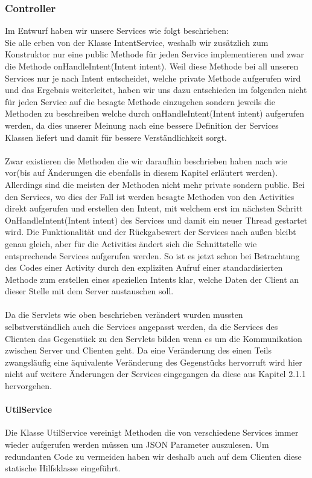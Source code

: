 \documentclass{scrartcl}
\begin{document}
	\subsubsection{Controller}
	Im Entwurf haben wir unsere Services wie folgt beschrieben: 
\\
Sie alle erben von der Klasse IntentService, weshalb wir zusätzlich zum Konstruktor nur eine public Methode für jeden Service implementieren und zwar die Methode onHandleIntent(Intent intent). Weil diese Methode bei all unseren Services nur je nach Intent entscheidet, welche private Methode aufgerufen wird und das Ergebnis weiterleitet, haben wir uns dazu entschieden im folgenden nicht für jeden Service auf die besagte Methode einzugehen sondern jeweils die Methoden zu beschreiben welche durch onHandleIntent(Intent intent) aufgerufen werden, da dies unserer Meinung nach eine bessere Definition der Services Klassen liefert und damit für bessere Verständlichkeit sorgt.
\\
\\
Zwar existieren die Methoden die wir daraufhin beschrieben haben nach wie vor(bis auf Änderungen die ebenfalls in diesem Kapitel erläutert werden).
Allerdings sind die meisten der Methoden nicht mehr private sondern public. Bei den Services, wo dies der Fall ist werden besagte Methoden von den Activities direkt aufgerufen und erstellen den Intent, mit welchem erst im nächsten Schritt OnHandleIntent(Intent intent) des Services und damit ein neuer Thread gestartet wird. 
Die Funktionalität und der Rückgabewert der Services nach außen bleibt genau gleich, aber für die Activities ändert sich die Schnittstelle wie entsprechende Services aufgerufen werden.
So ist es jetzt schon bei Betrachtung des Codes einer Activity durch den expliziten Aufruf einer standardisierten Methode zum erstellen eines speziellen Intents klar, welche Daten der Client an dieser Stelle mit dem Server austauschen soll.    
\\
\\
Da die Servlets wie oben beschrieben verändert wurden mussten selbstverständlich auch die Services angepasst werden, da die Services des Clienten das Gegenstück zu den Servlets bilden wenn es um die Kommunikation zwischen Server und Clienten geht.
Da eine Veränderung des einen Teils zwangsläufig eine äquivalente Veränderung des Gegenstücks hervorruft wird hier nicht auf weitere Änderungen der Services eingegangen da diese aus Kapitel 2.1.1 hervorgehen.

\paragraph{UtilService} Die Klasse UtilService vereinigt Methoden die von verschiedene Services immer wieder aufgerufen werden müssen um JSON Parameter auszulesen. Um redundanten Code zu vermeiden haben wir deshalb auch auf dem Clienten diese statische Hilfsklasse eingeführt.  	
\end{document}
